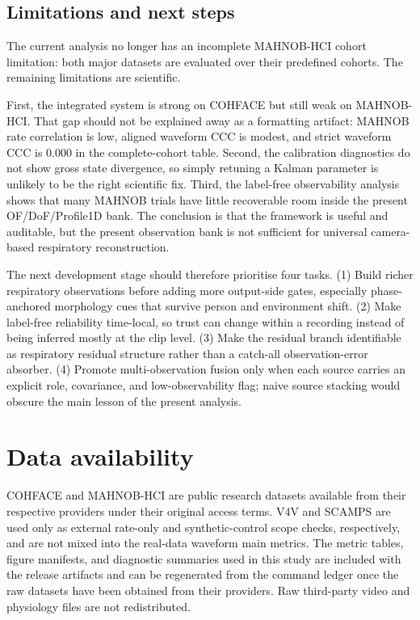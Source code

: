 \documentclass[fleqn,10pt]{wlscirep}
\begin{document}
\subsection*{Limitations and next steps}
The current analysis no longer has an incomplete MAHNOB-HCI cohort limitation:
both major datasets are evaluated over their predefined cohorts. The remaining limitations
are scientific.

First, the integrated system is strong on COHFACE but still weak on
MAHNOB-HCI. That gap should not be explained away as a formatting artifact:
MAHNOB rate correlation is low, aligned waveform CCC is modest, and strict
waveform CCC is 0.000 in the complete-cohort table. Second, the
calibration diagnostics do not
show gross state divergence, so simply retuning a Kalman parameter is unlikely
to be the right scientific fix. Third, the label-free observability analysis shows
that many MAHNOB trials have little recoverable room inside the present
OF/DoF/Profile1D bank. The conclusion is that the framework is useful and
auditable, but the present observation bank is not sufficient for universal
camera-based respiratory reconstruction.

The next development stage should therefore prioritise four tasks. (1) Build
richer respiratory observations before adding more output-side gates, especially
phase-anchored morphology cues that survive person and environment shift. (2)
Make label-free reliability time-local, so trust can change within a recording
instead of being inferred mostly at the clip level. (3) Make the residual branch
identifiable as respiratory residual structure rather than a catch-all
observation-error absorber. (4) Promote multi-observation fusion only when each
source carries an explicit role, covariance, and low-observability flag; naive
source stacking would obscure the main lesson of the present analysis.
\section*{Data availability}
COHFACE and MAHNOB-HCI are public research datasets available from their
respective providers under their original access terms. V4V and SCAMPS are used
only as external rate-only and synthetic-control scope checks, respectively, and
are not mixed into the real-data waveform main metrics. The metric tables,
figure manifests, and diagnostic summaries used in this study are
included with the release artifacts and can be regenerated from the command
ledger once the raw datasets have been obtained from their providers. Raw
third-party video and physiology files are not redistributed.
\end{document}
